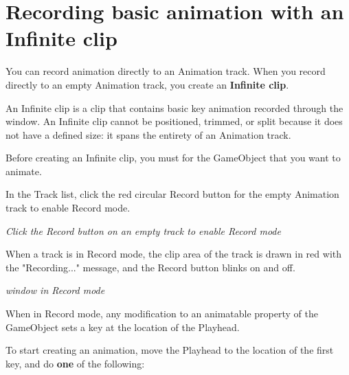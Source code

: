 \chapter{Recording basic animation with an Infinite clip}
\hypertarget{md__hey_tea_9_2_library_2_package_cache_2com_8unity_8timeline_0d1_87_85_2_documentation_0i_2wf__rec__anim}{}\label{md__hey_tea_9_2_library_2_package_cache_2com_8unity_8timeline_0d1_87_85_2_documentation_0i_2wf__rec__anim}
\label{md__hey_tea_9_2_library_2_package_cache_2com_8unity_8timeline_0d1_87_85_2_documentation_0i_2wf__rec__anim_autotoc_md4774}%
%
 You can record animation directly to an Animation track. When you record directly to an empty Animation track, you create an {\bfseries{Infinite clip}}.

An Infinite clip is a clip that contains basic key animation recorded through the  window. An Infinite clip cannot be positioned, trimmed, or split because it does not have a defined size\+: it spans the entirety of an Animation track.

Before creating an Infinite clip, you must  for the Game\+Object that you want to animate.

In the Track list, click the red circular Record button for the empty Animation track to enable Record mode.



{\itshape Click the Record button on an empty track to enable Record mode}

When a track is in Record mode, the clip area of the track is drawn in red with the "{}\+Recording..."{} message, and the Record button blinks on and off.



{\itshape {} window in Record mode}

When in Record mode, any modification to an animatable property of the Game\+Object sets a key at the location of the  Playhead.

To start creating an animation, move the  Playhead to the location of the first key, and do {\bfseries{one}} of the following\+:


